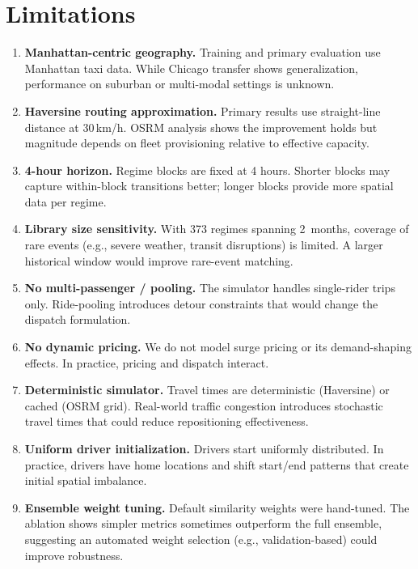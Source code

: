 \documentclass[conference,10pt]{IEEEtran}
\begin{document}
\section{Limitations}
\label{sec:limitations}

\begin{enumerate}
  \item \textbf{Manhattan-centric geography.} Training and primary
    evaluation use Manhattan taxi data. While Chicago transfer shows
    generalization, performance on suburban or multi-modal settings is
    unknown.

  \item \textbf{Haversine routing approximation.} Primary results use
    straight-line distance at 30\,km/h. OSRM analysis shows the
    improvement holds but magnitude depends on fleet provisioning
    relative to effective capacity.

  \item \textbf{4-hour horizon.} Regime blocks are fixed at 4 hours.
    Shorter blocks may capture within-block transitions better;
    longer blocks provide more spatial data per regime.

  \item \textbf{Library size sensitivity.} With 373 regimes spanning
    2~months, coverage of rare events (e.g., severe weather, transit
    disruptions) is limited. A larger historical window would improve
    rare-event matching.

  \item \textbf{No multi-passenger / pooling.} The simulator handles
    single-rider trips only. Ride-pooling introduces detour constraints
    that would change the dispatch formulation.

  \item \textbf{No dynamic pricing.} We do not model surge pricing or
    its demand-shaping effects. In practice, pricing and dispatch
    interact.

  \item \textbf{Deterministic simulator.} Travel times are
    deterministic (Haversine) or cached (OSRM grid). Real-world
    traffic congestion introduces stochastic travel times that could
    reduce repositioning effectiveness.

  \item \textbf{Uniform driver initialization.} Drivers start uniformly
    distributed. In practice, drivers have home locations and shift
    start/end patterns that create initial spatial imbalance.

  \item \textbf{Ensemble weight tuning.} Default similarity weights
    were hand-tuned. The ablation shows simpler metrics sometimes
    outperform the full ensemble, suggesting an automated weight
    selection (e.g., validation-based) could improve robustness.
\end{enumerate}
\end{document}
